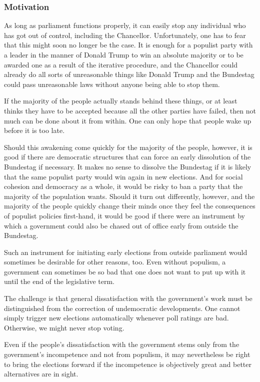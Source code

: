 \subsubsection{Motivation}\label{subsubsec:emergency_brake_motivation}
As long as parliament functions properly, it can easily stop any individual who has got out of control, including the Chancellor. Unfortunately, one has to fear that this might soon no longer be the case. It is enough for a populist party with a leader in the manner of Donald Trump to win an absolute majority or to be awarded one as a result of the iterative procedure, and the Chancellor could already do all sorts of unreasonable things like Donald Trump and the Bundestag could pass unreasonable laws without anyone being able to stop them.

If the majority of the people actually stands behind these things, or at least thinks they have to be accepted because all the other parties have failed, then not much can be done about it from within.
One can only hope that people wake up before it is too late.

Should this awakening come quickly for the majority of the people, however, it is good if there are democratic structures that can force an early dissolution of the Bundestag if necessary.
It makes no sense to dissolve the Bundestag if it is likely that the same populist party would win again in new elections.
And for social cohesion and democracy as a whole, it would be risky to ban a party that the majority of the population wants.
Should it turn out differently, however, and the majority of the people quickly change their minds once they feel the consequences of populist policies first-hand, it would be good if there were an instrument by which a government could also be chased out of office early from outside the Bundestag.

Such an instrument for initiating early elections from outside parliament would sometimes be desirable for other reasons, too.
Even without populism, a government can sometimes be so bad that one does not want to put up with it until the end of the legislative term.

The challenge is that general dissatisfaction with the government's work must be distinguished from the correction of undemocratic developments.
One cannot simply trigger new elections automatically whenever poll ratings are bad.
Otherwise, we might never stop voting.

Even if the people's dissatisfaction with the government stems only from the government's incompetence and not from populism, it may nevertheless be right
to bring the elections forward if the incompetence is objectively great and better alternatives are in sight.

